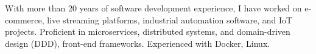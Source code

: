 

\begin{cvparagraph}

With more than 20 years of software development experience, I have worked on e-commerce, live streaming platforms, industrial automation software, and IoT projects. 
Proficient in microservices, distributed systems, and domain-driven design (DDD), front-end frameworks.
Experienced with Docker, Linux.
\end{cvparagraph}
